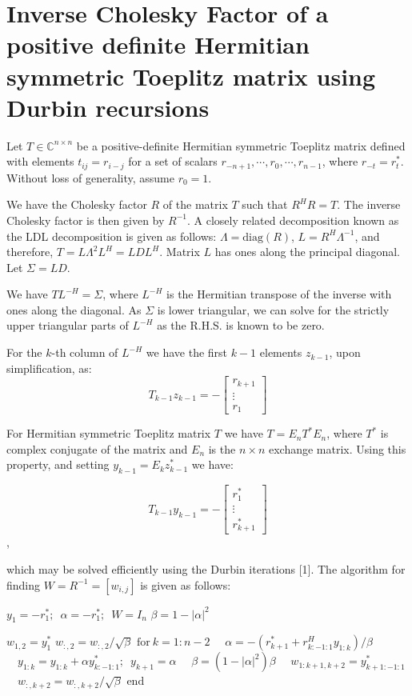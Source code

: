 \section{Inverse Cholesky Factor of a positive definite Hermitian symmetric Toeplitz matrix using Durbin recursions}

Let $T \in \mathbb{C}^{n \times n}$ be a positive-definite Hermitian symmetric Toeplitz matrix defined with elements $t_{ij} = r_{i-j}$ for a set of scalars $r_{-n+1}, \cdots, r_0, \cdots, r_{n-1}$, where $r_{-t} = r_t^*$. Without loss of generality, assume $r_0 = 1$.

We have the Cholesky factor $R$ of the matrix $T$ such that $R^H R = T$. The inverse Cholesky factor is then given by $R^{-1}$. A closely related decomposition known as the LDL decomposition is given as follows: $\Lambda = \text{diag}(R)$, $L = R^H \Lambda^{-1}$, and therefore, $T = L \Lambda^2 L^H = L D L^H$. Matrix $L$ has ones along the principal diagonal. Let $\Sigma = LD$.

We have $T L^{-H} = \Sigma$, where $L^{-H}$ is the Hermitian transpose of the inverse with ones along the diagonal. As $\Sigma$ is lower triangular, we can solve for the strictly upper triangular parts of $L^{-H}$ as the R.H.S. is known to be zero.

For the $k$-th column of $L^{-H}$ we have the first $k-1$ elements $z_{k-1}$, upon simplification, as:
$$T_{k-1} z_{k-1} = - \begin{bmatrix} r_{k+1} \\ \vdots \\ r_1 \end{bmatrix}$$

For Hermitian symmetric Toeplitz matrix $T$ we have $T = E_n T^* E_n$, where $T^*$ is complex conjugate of the matrix and $E_n$ is the $n \times n$ exchange matrix. Using this property, and setting $y_{k-1} = E_k z^*_{k-1}$ we have:

$$T_{k-1} y_{k-1} = - \begin{bmatrix} r^*_1 \\ \vdots \\ r^*_{k+1} \end{bmatrix}$$,

which may be solved efficiently using the Durbin iterations [1]. The algorithm for finding $W = R^{-1} = [w_{i,j}]$ is given as follows:

$y_1 = -r^*_1; \enspace \alpha = -r^*_1; \enspace W = I_n$
$\beta = 1 - |\alpha|^2$

$w_{1,2} = y^*_1$
$w_{:,2} = w_{:,2}/\sqrt\beta$
$\text{for}~ k = 1:n-2$
$\quad \alpha = -(r^*_{k+1} + r^H_{k:-1:1} y_{1:k}) /\beta$
$\quad y_{1:k} = y_{1:k} + \alpha y^*_{k:-1:1}; \enspace y_{k+1} = \alpha$
$\quad \beta = (1 - |\alpha|^2) \beta$
$\quad w_{1:k+1,k+2} = y^*_{k+1:-1:1}$
$\quad w_{:,k+2} = w_{:,k+2}/\sqrt\beta$
$\text{end}$

